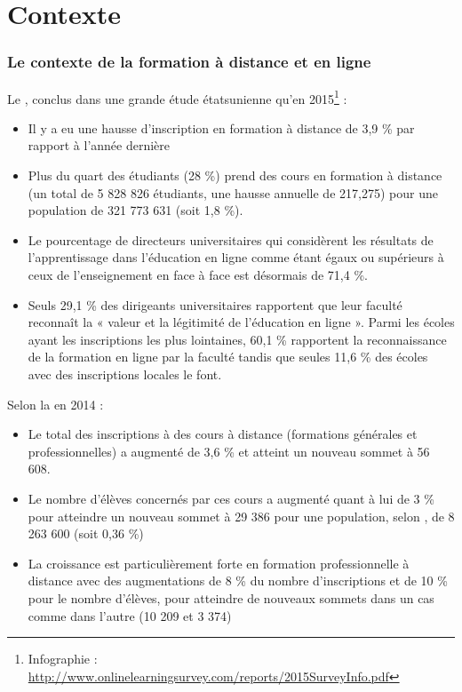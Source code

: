 \documentclass[aspectratio=169]{beamer}
\begin{document}
	\section{Contexte} 
		\begin{frame}[allowframebreaks]
			\frametitle{Le contexte de la formation à distance et en ligne}
			Le \citet{OLC2015a}, conclus dans une grande étude étatsunienne qu'en 2015\footnote{Infographie : \url {http://www.onlinelearningsurvey.com/reports/2015SurveyInfo.pdf} } :
			\begin {itemize}
				\item Il y a eu une hausse d'inscription en formation à distance de 3,9 \% par rapport à l'année dernière
				\item Plus du quart des étudiants (28 \%) prend des cours en formation à distance (un  total de 5 828 826 étudiants, une hausse annuelle de 217,275)  pour une population de 321 773 631 (soit 1,8  \%).
				\item Le pourcentage de directeurs universitaires qui considèrent les résultats de l'apprentissage dans l'éducation en ligne comme étant égaux ou supérieurs à ceux de l'enseignement en face à face est désormais de 71,4 \%.
				\item Seuls 29,1 \% des dirigeants universitaires rapportent que leur faculté reconnaît la « valeur et la légitimité de l'éducation en ligne ». Parmi les écoles ayant les inscriptions les plus lointaines, 60,1 \% rapportent la reconnaissance de la formation en ligne par la faculté tandis que seules 11,6 \% des écoles avec des inscriptions locales le font. 
			\end{itemize}
			\framebreak
			Selon la \citet{sofad2015a} en 2014 : 
			\begin {itemize}
				\item Le total des inscriptions à des cours à distance (formations générales et professionnelles) a augmenté de 3,6 \% et atteint un nouveau sommet à 56 608.
				\item Le nombre d’élèves concernés par ces cours a augmenté quant à lui de 3 \% pour atteindre un nouveau sommet à 29 386 pour une population, selon \citet{is2015a}, de 8 263 600 (soit 0,36 \%)
				\item La croissance est particulièrement forte en formation professionnelle à distance avec des augmentations de 8 \% du nombre d’inscriptions et de 10 \% pour le nombre d’élèves, pour atteindre de nouveaux sommets dans un cas comme dans l’autre (10 209 et 3 374)
			\end{itemize}
		\end{frame}
		
\end{document}
